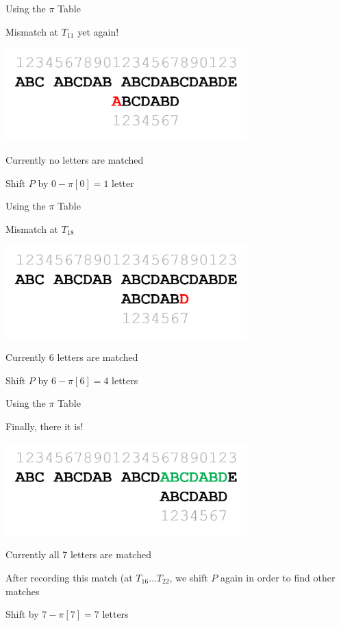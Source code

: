 \documentclass[13pt,onlymath]{beamer}
\begin{document}
\begin{frame}{Using the $\pi$ Table}
\BIT
\item Mismatch at $T_{11}$ yet again!
\begin{center}
\includegraphics[width=0.7\textwidth]{figures/kmp6}
\end{center}
\item Currently no letters are matched
\item Shift $P$ by $0-\pi[0] = 1$ letter
\EIT
\end{frame}

\begin{frame}{Using the $\pi$ Table}
\BIT
\item Mismatch at $T_{18}$
\begin{center}
\includegraphics[width=0.7\textwidth]{figures/kmp7}
\end{center}
\item Currently 6 letters are matched
\item Shift $P$ by $6-\pi[6] = 4$ letters
\EIT
\end{frame}

\begin{frame}{Using the $\pi$ Table}
\BIT
\item Finally, there it is!
\begin{center}
\includegraphics[width=0.7\textwidth]{figures/kmp8}
\end{center}
\item Currently all 7 letters are matched
\item After recording this match (at $T_{16} \ldots T_{22}$, we shift $P$ again in order to find other matches
\BIT
\item Shift by $7-\pi[7] = 7$ letters
\EIT\EIT
\end{frame}
\end{document}
